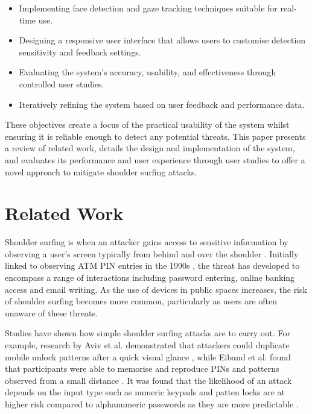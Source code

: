 \documentclass[12pt]{article}
\theoremstyle{plain}
\theoremstyle{definition}
\begin{document}
\begin{itemize}
  \item Implementing face detection and gaze tracking techniques suitable for real-time use.
  \item Designing a responsive user interface that allows users to customise detection sensitivity and feedback settings.
  \item Evaluating the system’s accuracy, usability, and effectiveness through controlled user studies.
  \item Iteratively refining the system based on user feedback and performance data.
\end{itemize}

These objectives create a focus of the practical usability of the system whilst ensuring it is reliable enough to detect any potential threats. This paper presents a review of related work, details the design and implementation of the system, and evaluates its performance and user experience through user studies to offer a novel approach to mitigate shoulder surfing attacks.

\section{Related Work}
\label{sec:Related Work} 

Shoulder surfing is when an attacker gains access to sensitive information by observing a user’s screen typically from behind and over the shoulder \cite{long_no_2011}. Initially linked to observing ATM PIN entries in the 1990s \cite{anderson_security_2001}, the threat has developed to encompass a range of interactions including password entering, online banking access and email writing. As the use of devices in public spaces increases, the risk of shoulder surfing becomes more common, particularly as users are often unaware of these threats.

Studies have shown how simple shoulder surfing attacks are to carry out. For example, research by Aviv et al. demonstrated that attackers could duplicate mobile unlock patterns after a quick visual glance \cite{aviv_towards_2017}, while Eiband et al. found that participants were able to memorise and reproduce PINs and patterns observed from a small distance \cite{eiband_understanding_2017}. It was found that the likelihood of an attack depends on the input type such as numeric keypads and patten locks are at higher risk compared to alphanumeric passwords as they are more predictable \cite{tari_comparison_2006}.
\end{document}
